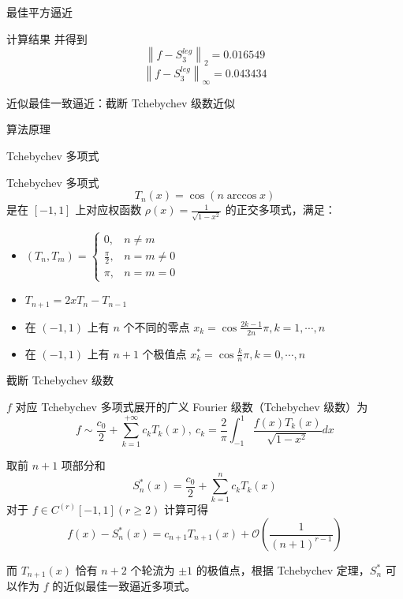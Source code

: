 \documentclass[a4paper]{article}
\begin{document}
\begin{multicols}{2}
\begin{section}{最佳平方逼近}
\begin{subsection}{计算结果}
		并得到 $$\left\|f-S_3^{leg}\right\|_2 = 0.016549$$ $$\left\|f-S_3^{leg}\right\|_{\infty} = 0.043434$$
	\end{subsection}
	
\end{section}

\begin{section}{近似最佳一致逼近：截断 Tchebychev 级数近似}

	\begin{subsection}{算法原理}
	
		\begin{subsubsection}{Tchebychev 多项式}
		
			Tchebychev 多项式 $$T_{n}(x)=\cos (n \arccos x)$$ 是在 $[-1,1]$ 上对应权函数 $\rho(x)=\frac{1}{\sqrt{1-x^{2}}}$ 的正交多项式，满足：
			
			\begin{itemize}
				\item $\left(T_{n}, T_{m}\right)=\left\{\begin{array}{ll}{0,} & {n \neq m} \\ {\frac{\pi}{2},} & {n=m \neq 0} \\ {\pi,} & {n=m=0}\end{array}\right.$
				\item $T_{n+1}=2 x T_{n}-T_{n-1}$
				\item 在 $(-1,1)$ 上有 $n$ 个不同的零点 $x_{k}=\cos \frac{2 k-1}{2 n} \pi, k=1, \cdots, n$
				\item 在 $(-1,1)$ 上有 $n+1$ 个极值点 $x_{k}^{*}=\cos \frac{k}{n} \pi, k=0, \cdots, n$
			\end{itemize}
			
		\end{subsubsection}
		
		\begin{subsubsection}{截断 Tchebychev 级数}
			
			$f$ 对应 Tchebychev 多项式展开的广义 Fourier 级数（Tchebychev 级数）为 $$f \sim \frac{c_{0}}{2}+\sum_{k=1}^{+\infty} c_{k} T_{k}(x), \ c_{k}=\frac{2}{\pi} \int_{-1}^{1} \frac{f(x) T_{k}(x)}{\sqrt{1-x^{2}}} d x$$
			
			取前 $n+1$ 项部分和 $$S_{n}^{*}(x)=\frac{c_{0}}{2}+\sum_{k=1}^{n} c_{k} T_{k}(x)$$ 对于 $f \in C^{(r)}[-1,1](r \geq 2)$ 计算可得 $$f(x)-S_{n}^{*}(x)=c_{n+1} T_{n+1}(x)+\mathcal{O}\left(\frac{1}{(n+1)^{r-1}}\right)$$
			
			而 $T_{n+1}(x)$ 恰有 $n+2$ 个轮流为 $\pm 1$ 的极值点，根据 Tchebychev 定理，$S_{n}^{*}$ 可以作为 $f$ 的近似最佳一致逼近多项式。
			

\end{subsubsection}
\end{subsection}
\end{section}
\end{multicols}
\end{document}

